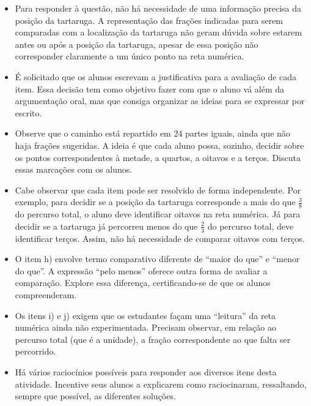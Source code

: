 \begin{multicols}{2}
\begin{orientacoes}{}{}
\begin{itemize} %
  \item Para responder à questão, não há necessidade de uma informação precisa da posição da tartaruga. A representação das frações indicadas para serem comparadas com a localização da tartaruga não geram dúvida sobre estarem antes ou após a posição da tartaruga, apesar de essa posição não corresponder claramente a um único ponto na reta numérica.
    \item É solicitado que os alunos escrevam a justificativa para a avaliação de cada item. Essa decisão tem como objetivo fazer com que o aluno vá além da argumentação oral, mas que consiga organizar as ideias para se expressar por escrito.
    \item Observe que o caminho está repartido em 24 partes iguais, ainda que não haja frações sugeridas. A ideia é que cada aluno possa, sozinho, decidir sobre os pontos correspondentes à metade, a quartos, a oitavos e a terços. Discuta essas marcações com os alunos.
    \item Cabe observar que cada item pode ser resolvido de forma independente. Por exemplo, para decidir se a posição da tartaruga corresponde a mais do que       $\frac{3}{8}$       do percurso total, o aluno deve identificar oitavos na reta numérica. Já para decidir se a tartaruga já percorreu menos do que       $\frac{2}{3}$       do percurso total, deve identificar terços. Assim, não há necessidade de comparar oitavos com terços.
    \item O item h) envolve termo comparativo diferente de ``maior do que'' e ``menor do que''. A expressão ``pelo menos'' oferece outra forma de avaliar a comparação. Explore essa diferença, certificando-se de que os alunos compreenderam.
    \item Os itens i) e j) exigem que os estudantes façam uma ``leitura'' da reta numérica ainda não experimentada. Precisam observar, em relação ao percurso total (que é a unidade), a fração correspondente ao que falta ser percorrido.
    \item Há vários raciocínios possíveis para responder aos diversos itens desta atividade. Incentive seus alunos a explicarem como raciocinaram, ressaltando, sempre que possível, as diferentes soluções.
\end{itemize} %
\end{orientacoes}


\end{multicols}
